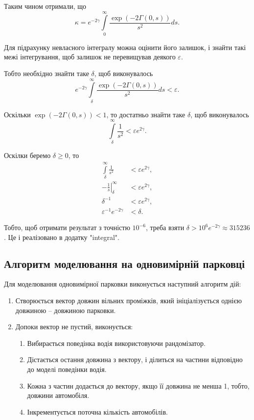 Таким чином отримали, що
\begin{equation}
\kappa = e^{-2\gamma} \int\limits_0^\infty \frac{\exp(-2\Gamma(0,s))}{s^2} ds.
\end{equation}

Для підрахунку невласного інтегралу можна оцінити його залишок, і знайти такі межі інтегрування, щоб залишок не перевищував деякого $\varepsilon$.

Тобто необхідно знайти таке $\delta$, щоб виконувалось
$$
	e^{-2\gamma} \int\limits_\delta^\infty \frac{\exp(-2\Gamma(0,s))}{s^2} ds < \varepsilon.
$$

Оскільки $\exp(-2\Gamma(0,s)) < 1$, то достатньо знайти таке $\delta$, щоб виконувалось
$$
	\int\limits_\delta^\infty \frac{1}{s^2} < \varepsilon e^{2\gamma}.
$$

Оскілки беремо $\delta \geq 0$, то
\begin{align*}
	\int\limits_\delta^\infty \frac{1}{s^2} &< \varepsilon e^{2\gamma},\\
	-\left. \frac{1}{s} \right|_\delta^\infty &< \varepsilon e^{2\gamma}, \\
	\delta^{-1} &< \varepsilon e^{2\gamma},  \\
	\varepsilon^{-1} e^{-2\gamma} &< \delta.
\end{align*}

Тобто, щоб отримати результат з точністю $10^{-6}$, треба взяти  $\delta > 10^6 e^{-2\gamma} \approx 315236$. Це і реалізовано в додатку "integral".

\subsection{Алгоритм моделювання на одновимірній парковці}

Для моделювання одновимірної парковки виконується наступний алгоритм дій:
\begin{enumerate}[label={\arabic*.}]
\item Створюється вектор довжин вільних проміжків, який ініціалізується однією довжиною – довжиною парковки. 
\item Допоки вектор не пустий, виконується: 
\begin{enumerate}[label={2.\arabic*.}]
\item Вибирається поведінка водія використовуючи рандомізатор.
\item Дістається остання довжина з вектору, і ділиться на частини відповідно до моделі поведінки водія.
\item Кожна з частин додається до вектору, якщо її довжина не менша 1, тобто, довжини автомобіля.
\item Інкрементується поточна кількість автомобілів.
\end{enumerate}
\end{enumerate}

